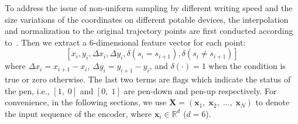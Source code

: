 \documentclass[a4paper,conference]{IEEEtran}
\begin{document}
To address the issue of non-uniform sampling by different writing speed and the size variations of the coordinates on different potable devices, the interpolation and normalization to the original trajectory points are first conducted according to~\cite{zhang2017drawing}. Then we extract a 6-dimensional feature vector for each point:
\begin{equation}\label{eq:6dimensional feature}
\left[ {{x_i},{y_i},\Delta {x_i},\Delta {y_i},\delta ({s_i} = {s_{i + 1}}),\delta ({s_i} \ne {s_{i + 1}})} \right]
\end{equation}
where $\Delta {x_i}={x_{i+1}}-{x_i}$, $\Delta {y_i}={y_{i+1}}-{y_i}$, and $\delta ( \cdot ) = 1$ when the condition is true or zero otherwise. The last two terms are flags which indicate the status of the pen, i.e., $\left[ {1,\;0} \right]$ and $\left[ {0,\;1} \right]$ are pen-down and pen-up respectively. For convenience, in the following sections, we use $\mathbf{X}=\left( {{\mathbf{x}_1},\;{\mathbf{x}_2},\; \ldots ,\;{\mathbf{x}_N}} \right)$ to denote the input sequence of the encoder, where ${\mathbf{x}_i} \in {\mathbb{R}^d}$ ($d=6$).
\end{document}
